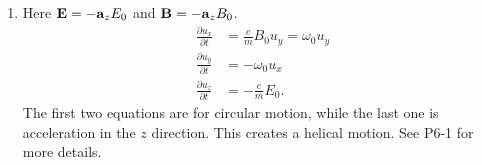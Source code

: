 \documentclass[../../header.tex]{subfiles}
\begin{document}
{\begin{enumerate}[label=(\alph*)]
\item Here $\mathbf{E}=-\mathbf{a}_zE_0$ and $\mathbf{B} = -\mathbf{a}_z B_0$.
\begin{align*}
\frac{\partial u_x}{\partial t} &= \frac{e}{m}B_0u_y = \omega_0u_y\\
\frac{\partial u_y}{\partial t} &= -\omega_0 u_x\\
\frac{\partial u_z}{\partial t} &= -\frac{e}{m}E_0.
\end{align*}
The first two equations are for circular motion, while the last one is acceleration in the $z$ direction. This creates a helical motion. See P6-1 for more details.
\end{enumerate}
}

\end{document}
